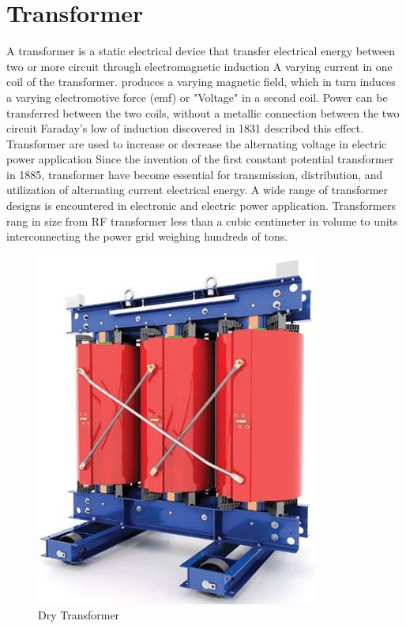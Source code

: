 \documentclass[12pt,fleqn]{book} %
\begin{document}
\section{Transformer}
A transformer is a static electrical device that transfer electrical energy between two or more circuit through electromagnetic induction A varying current in one coil of the transformer. produces a varying magnetic field, which in turn induces a varying electromotive force (emf) or "Voltage" in a second coil. Power can be transferred between the two coils, without a metallic connection between the two circuit Faraday's low of induction discovered in 1831 described this effect. Transformer are used to increase or decrease the alternating voltage in electric power application Since the invention of the first constant potential transformer in 1885, transformer have become essential for transmission, distribution, and utilization of alternating current electrical energy. A wide range of transformer designs is encountered in electronic and electric power application. Transformers rang in size from RF transformer less than a cubic centimeter in volume to units interconnecting the power grid weighing hundreds of tons.
\begin{figure}[h!]
    \centering
    \includegraphics[width=0.7\linewidth]{hamdy 6.png}
    \caption{Dry Transformer}
    \label{fig:hamdy 4}
\end{figure}
\end{document}

